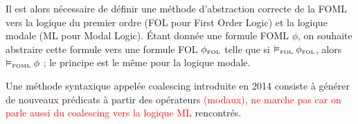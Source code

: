 \documentclass[12pt]{article}
\newcommand{\FOL}{\ensuremath{\textup{\tiny{}FOL}}}
\newcommand{\FOML}{\ensuremath{\textup{\tiny{}FOML}}}
\newcommand{\raph}[1]{\textcolor{red}{#1}}
\begin{document}
Il est alors nécessaire de définir une méthode d'abstraction correcte de la FOML vers la logique du premier ordre (FOL pour First Order Logic) et la logique modale (ML pour Modal Logic).
Étant donnée une formule FOML $\phi$, on souhaite abstraire cette formule vers une formule FOL $\phi_\FOL$ telle que si $\vDash_\FOL \phi_\FOL$, alors $\vDash_\FOML \phi$ ; le principe est le même pour la logique modale.

Une méthode syntaxique appelée \og{}coalescing\fg{} introduite en 2014 consiste à générer de nouveaux prédicats à partir des opérateurs \raph{(modaux), ne marche pas car on parle aussi du coalescing vers la logique ML} rencontrés.
\end{document}
